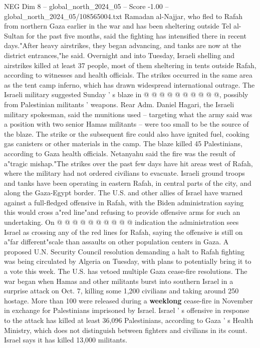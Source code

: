 \begin{textsample}{NEG Dim 8 – global\_north\_2024\_05 – Score -1.00 – global\_north\_2024\_05/108565004.txt}
Ramadan al-Najjar, who fled to Rafah from northern Gaza earlier in the war and has been sheltering outside Tel al-Sultan for the past five months, said the fighting has intensified there in recent days."After heavy airstrikes, they began advancing, and tanks are now at the district entrances,"he said.
Overnight and into Tuesday, Israeli shelling and airstrikes killed at least 37 people, most of them sheltering in tents outside Rafah, according to witnesses and health officials.
The strikes occurred in the same area as the tent camp inferno, which has drawn widespread international outrage.
The Israeli military suggested Sunday ' s blaze in @ @ @ @ @ @ @ @ @ @, possibly from Palestinian militants ' weapons.
Rear Adm.
Daniel Hagari, the Israeli military spokesman, said the munitions used -- targeting what the army said was a position with two senior Hamas militants -- were too small to be the source of the blaze.
The strike or the subsequent fire could also have ignited fuel, cooking gas canisters or other materials in the camp.
The blaze killed 45 Palestinians, according to Gaza health officials.
Netanyahu said the fire was the result of a"tragic mishap."The strikes over the past few days have hit areas west of Rafah, where the military had not ordered civilians to evacuate.
Israeli ground troops and tanks have been operating in eastern Rafah, in central parts of the city, and along the Gaza-Egypt border.
The U.S. and other allies of Israel have warned against a full-fledged offensive in Rafah, with the Biden administration saying this would cross a"red line"and refusing to provide offensive arms for such an undertaking.
On @ @ @ @ @ @ @ @ @ @ indication the administration sees Israel as crossing any of the red lines for Rafah, saying the offensive is still on a"far different"scale than assaults on other population centers in Gaza.
A proposed U.N.
Security Council resolution demanding a halt to Rafah fighting was being circulated by Algeria on Tuesday, with plans to potentially bring it to a vote this week.
The U.S. has vetoed multiple Gaza cease-fire resolutions.
The war began when Hamas and other militants burst into southern Israel in a surprise attack on Oct. 7, killing some 1,200 civilians and taking around 250 hostage.
More than 100 were released during a \textbf{weeklong} cease-fire in November in exchange for Palestinians imprisoned by Israel.
Israel ' s offensive in response to the attack has killed at least 36,096 Palestinians, according to Gaza ' s Health Ministry, which does not distinguish between fighters and civilians in its count.
Israel says it has killed 13,000 militants.

\end{textsample}
